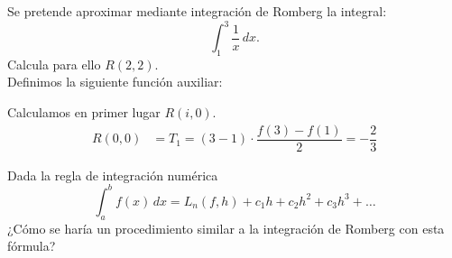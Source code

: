 \documentclass[12pt]{article}
\author{Arturo Olivares Martos}
\date{\today}
\begin{document}
    {\color{blue}

    \renewcommand{\headrulewidth}{1pt}
    \renewcommand{\headrule}{\hbox to\headwidth{%
    \color{blue}\leaders\hrule height \headrulewidth\hfill}}
    
    \begin{ejercicio}
        Se pretende aproximar mediante integración de Romberg la integral:
        \begin{equation*}
            \int_1^3 \frac{1}{x} \, dx.
        \end{equation*}
        Calcula para ello \( R(2, 2) \).\\

        Definimos la siguiente función auxiliar:

        Calculamos en primer lugar \( R(i, 0) \).
        \begin{align*}
            R(0, 0) &= T_1 = (3-1)\cdot \dfrac{f(3)-f(1)}{2}
            = -\dfrac{2}{3} %
        \end{align*}
    \end{ejercicio}

    \begin{ejercicio}
        Dada la regla de integración numérica
        \begin{equation*}
            \int_a^b f(x) \, dx = L_n(f, h) + c_1 h + c_2 h^2 + c_3 h^3 + \ldots
        \end{equation*}
        ¿Cómo se haría un procedimiento similar a la integración de Romberg con esta fórmula?
    \end{ejercicio}
    }
\end{document}
